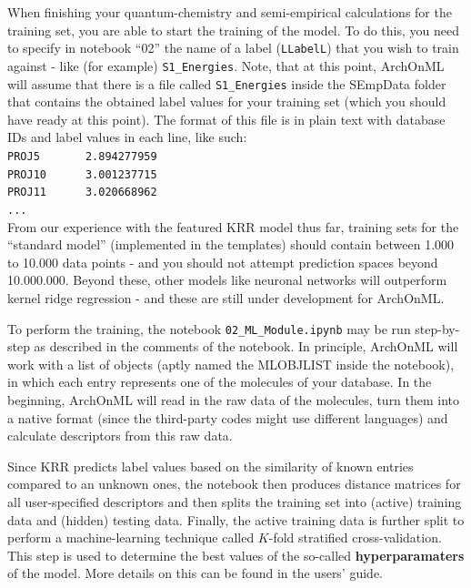 \documentclass[12pt]{achemso}
\begin{document}
\noindent When finishing your quantum-chemistry and semi-empirical calculations for the training set, you are able to start the training of the model. To do this, you need to specify in notebook ``02'' the name of a label (\texttt{LLabelL}) that you wish to train against - like (for example) \texttt{S1\_Energies}. Note, that at this point, ArchOnML will assume that there is a file called \texttt{S1\_Energies} inside the SEmpData folder that contains the obtained label values for your training set (which you should have ready at this point). The format of this file is in plain text with database IDs and label values in each line, like such:\\[-1.3em]

\noindent \verb+PROJ5       2.894277959+\\[-1em]
\noindent \verb+PROJ10      3.001237715+\\[-1em]
\noindent \verb+PROJ11      3.020668962+\\[-1em]
\noindent \verb+...+\\[-1.3em]

\noindent From our experience with the featured KRR model thus far, training sets for the ``standard model'' (implemented in the templates) should contain between 1.000 to 10.000 data points - and you should not attempt prediction spaces beyond 10.000.000. Beyond these, other models like neuronal networks will outperform kernel ridge regression - and these are still under development for ArchOnML.

\noindent To perform the training, the notebook \verb+02_ML_Module.ipynb+ may be run step-by-step as described in the comments of the notebook. In principle, ArchOnML will work with a list of objects (aptly named the MLOBJLIST inside the notebook), in which each entry represents one of the molecules of your database. In the beginning, ArchOnML will read in the raw data of the molecules, turn them into a native format (since the third-party codes might use different languages) and calculate descriptors from this raw data.

\noindent Since KRR predicts label values based on the similarity of known entries compared to an unknown ones, the notebook then produces distance matrices for all user-specified descriptors and then splits the training set into (active) training data and (hidden) testing data. Finally, the active training data is further split to perform a machine-learning technique called $K$-fold stratified cross-validation. This step is used to determine the best values of the so-called \textbf{hyperparamaters} of the model. More details on this can be found in the users' guide.
\end{document}

